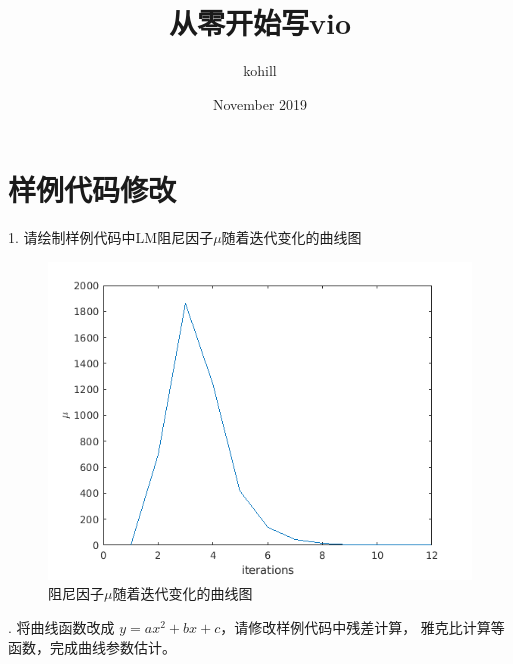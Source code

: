 \documentclass[oneside]{article}
\title{从零开始写vio}
\author{kohill}
\date{November 2019}
\begin{document}
\maketitle
\section{样例代码修改}
1. 请绘制样例代码中LM阻尼因子$\mu$随着迭代变化的曲线图
\begin{figure}[htbp]
    \centering
    \includegraphics[width=.5\linewidth]{figures/fig1.png}    
    \caption{阻尼因子$\mu$随着迭代变化的曲线图}
\end{figure}
. 将曲线函数改成 $y = ax^2 + bx + c$，请修改样例代码中残差计算，
雅克比计算等函数，完成曲线参数估计。
\end{document}
